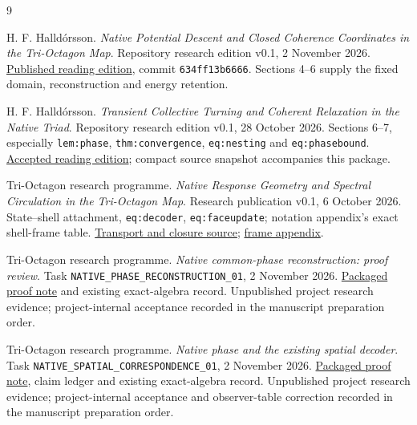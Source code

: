 \begin{thebibliography}{9}\small\raggedright
{}
H. F. Halld\'orsson.
\emph{Native Potential Descent and Closed Coherence Coordinates in the Tri-Octagon Map}.
Repository research edition v0.1, 2 November 2026.
\href{https://github.com/pzychozen/trioctagon-physics/tree/634ff13b666604d5caed11cc3731dcb5a863ff6c/papers/NATIVE_POTENTIAL_AND_CLOSED_COHERENCE/publication/v0.1}{Published reading edition}, commit \texttt{634ff13b6666}.
Sections 4--6 supply the fixed domain, reconstruction and energy retention.

H. F. Halld\'orsson.
\emph{Transient Collective Turning and Coherent Relaxation in the Native Triad}.
Repository research edition v0.1, 28 October 2026.
Sections 6--7, especially \texttt{lem:phase}, \texttt{thm:convergence}, \texttt{eq:nesting} and \texttt{eq:phasebound}.
\href{https://github.com/pzychozen/trioctagon-physics/blob/7cc1fa03af589818bcdcfaaac51838cc36c84253/papers/COLLECTIVE_TURNING_AND_COHERENT_RELAXATION/v0.1/main.tex}{Accepted reading edition}; compact source snapshot accompanies this package.

Tri-Octagon research programme.
\emph{Native Response Geometry and Spectral Circulation in the Tri-Octagon Map}.
Research publication v0.1, 6 October 2026.
State--shell attachment, \texttt{eq:decoder}, \texttt{eq:faceupdate}; notation appendix's exact shell-frame table.
\href{https://github.com/pzychozen/trioctagon-physics/blob/634ff13b666604d5caed11cc3731dcb5a863ff6c/papers/NATIVE_RESPONSE_GEOMETRY/manuscript/observables_closure.tex}{Transport and closure source};
\href{https://github.com/pzychozen/trioctagon-physics/blob/634ff13b666604d5caed11cc3731dcb5a863ff6c/papers/NATIVE_RESPONSE_GEOMETRY/manuscript/appendices.tex}{frame appendix}.

Tri-Octagon research programme.
\emph{Native common-phase reconstruction: proof review}.
Task \texttt{NATIVE\_PHASE\_RECONSTRUCTION\_01}, 2 November 2026.
\href{evidence/phase/NATIVE_PHASE_RECONSTRUCTION_01_PROOF_REVIEW.md}{Packaged proof note} and existing exact-algebra record.
Unpublished project research evidence; project-internal acceptance recorded in the manuscript preparation order.

Tri-Octagon research programme.
\emph{Native phase and the existing spatial decoder}.
Task \texttt{NATIVE\_SPATIAL\_CORRESPONDENCE\_01}, 2 November 2026.
\href{evidence/spatial/NATIVE_SPATIAL_CORRESPONDENCE_01_PROOF_REVIEW.md}{Packaged proof note}, claim ledger and existing exact-algebra record.
Unpublished project research evidence; project-internal acceptance and observer-table correction recorded in the manuscript preparation order.


\end{thebibliography}
